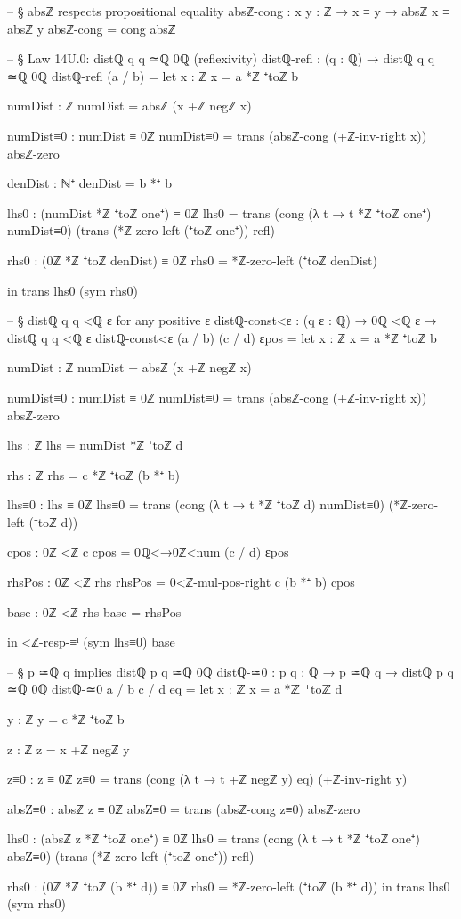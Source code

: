 \documentclass[11pt,a4paper]{book}
\begin{document}
\begin{code}
-- § absℤ respects propositional equality
absℤ-cong : {x y : ℤ} → x ≡ y → absℤ x ≡ absℤ y
absℤ-cong = cong absℤ

-- § Law 14U.0: distℚ q q ≃ℚ 0ℚ (reflexivity)
distℚ-refl : (q : ℚ) → distℚ q q ≃ℚ 0ℚ
distℚ-refl (a / b) =
  let x : ℤ
      x = a *ℤ ⁺toℤ b

      numDist : ℤ
      numDist = absℤ (x +ℤ negℤ x)

      numDist≡0 : numDist ≡ 0ℤ
      numDist≡0 =
        trans
          (absℤ-cong (+ℤ-inv-right x))
          absℤ-zero

      denDist : ℕ⁺
      denDist = b *⁺ b

      lhs0 : (numDist *ℤ ⁺toℤ one⁺) ≡ 0ℤ
      lhs0 =
        trans
          (cong (λ t → t *ℤ ⁺toℤ one⁺) numDist≡0)
          (trans (*ℤ-zero-left (⁺toℤ one⁺)) refl)

      rhs0 : (0ℤ *ℤ ⁺toℤ denDist) ≡ 0ℤ
      rhs0 = *ℤ-zero-left (⁺toℤ denDist)

  in
  trans lhs0 (sym rhs0)

-- § distℚ q q <ℚ ε for any positive ε
distℚ-const<ε : (q ε : ℚ) → 0ℚ <ℚ ε → distℚ q q <ℚ ε
distℚ-const<ε (a / b) (c / d) εpos =
  let x : ℤ
      x = a *ℤ ⁺toℤ b

      numDist : ℤ
      numDist = absℤ (x +ℤ negℤ x)

      numDist≡0 : numDist ≡ 0ℤ
      numDist≡0 =
        trans
          (absℤ-cong (+ℤ-inv-right x))
          absℤ-zero

      lhs : ℤ
      lhs = numDist *ℤ ⁺toℤ d

      rhs : ℤ
      rhs = c *ℤ ⁺toℤ (b *⁺ b)

      lhs≡0 : lhs ≡ 0ℤ
      lhs≡0 =
        trans
          (cong (λ t → t *ℤ ⁺toℤ d) numDist≡0)
          (*ℤ-zero-left (⁺toℤ d))

      cpos : 0ℤ <ℤ c
      cpos = 0ℚ<→0ℤ<num (c / d) εpos

      rhsPos : 0ℤ <ℤ rhs
      rhsPos = 0<ℤ-mul-pos-right c (b *⁺ b) cpos

      base : 0ℤ <ℤ rhs
      base = rhsPos

  in
  <ℤ-resp-≡ˡ (sym lhs≡0) base

-- § p ≃ℚ q implies distℚ p q ≃ℚ 0ℚ
distℚ-≃0 : {p q : ℚ} → p ≃ℚ q → distℚ p q ≃ℚ 0ℚ
distℚ-≃0 {a / b} {c / d} eq =
  let
    x : ℤ
    x = a *ℤ ⁺toℤ d

    y : ℤ
    y = c *ℤ ⁺toℤ b

    z : ℤ
    z = x +ℤ negℤ y

    z≡0 : z ≡ 0ℤ
    z≡0 =
      trans
        (cong (λ t → t +ℤ negℤ y) eq)
        (+ℤ-inv-right y)

    absZ≡0 : absℤ z ≡ 0ℤ
    absZ≡0 = trans (absℤ-cong z≡0) absℤ-zero

    lhs0 : (absℤ z *ℤ ⁺toℤ one⁺) ≡ 0ℤ
    lhs0 =
      trans
        (cong (λ t → t *ℤ ⁺toℤ one⁺) absZ≡0)
        (trans (*ℤ-zero-left (⁺toℤ one⁺)) refl)

    rhs0 : (0ℤ *ℤ ⁺toℤ (b *⁺ d)) ≡ 0ℤ
    rhs0 = *ℤ-zero-left (⁺toℤ (b *⁺ d))
  in
  trans lhs0 (sym rhs0)
\end{code}
\end{document}
